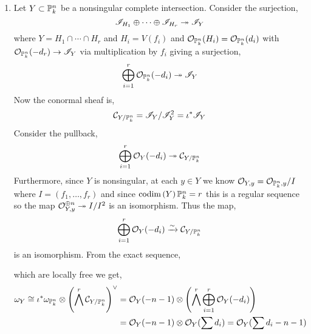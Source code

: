 \documentclass[12pt]{article}
\begin{document}
\begin{enumerate}
\item Let $Y \subset \P^n_k$ be a nonsingular complete intersection. Consider the surjection, 
\[ \I_{H_1} \oplus \cdots \oplus \I_{H_r} \onto \I_Y \]
where $Y = H_1 \cap \cdots \cap H_r$ and $H_i = V(f_i)$ and $\struct{\P^n_k}(H_i) = \struct{\P^n_k}(d_i)$ with $\struct{\P^n_k}(-d_r) \to \I_Y$ via multiplication by $f_i$ giving a surjection,
\[ \bigoplus_{i = 1}^r \struct{\P^n_k}(-d_i) \onto \I_Y \]
Now the conormal sheaf is,
\[ \C_{Y/\P^n_k} = \I_Y / \I_Y^2 = \iota^* \I_Y \]
Consider the pullback,
\[ \bigoplus_{i = 1}^r \struct{Y}(-d_i) \onto \C_{Y/\P^n_k} \]
Furthermore, since $Y$ is nonsingular, at each $y \in Y$ we know $\stalk{Y}{y} = \stalk{\P^n_k}{y} / I$ where $I = (f_1, \dots, f_r)$ and since $\codim{Y}{\P^n_k} = r$ this is a regular sequence so the map $\stalk{Y}{y}^{\oplus n} \onto I/I^2$ is an isomorphism. Thus the map,
\[ \bigoplus_{i = 1}^r \struct{Y}(-d_i) \iso \C_{Y/\P^n_k} \]
is an isomorphism. From the exact sequence,
\begin{center}
\end{center}
which are locally free we get,
\begin{align*}
\omega_Y \cong \iota^* \omega_{\P^n_k} \otimes \left( \bigwedge^r \C_{Y/\P^n_k} \right)^\vee & = \struct{Y}(-n-1) \otimes \left( \bigwedge^r \bigoplus_{i = 1}^r \struct{Y}(-d_i) \right)
\\
& = \struct{Y}(-n-1) \otimes \struct{Y}(\sum d_i) = \struct{Y}(\sum d_i - n - 1)
\end{align*}


\end{enumerate}
\end{document}
